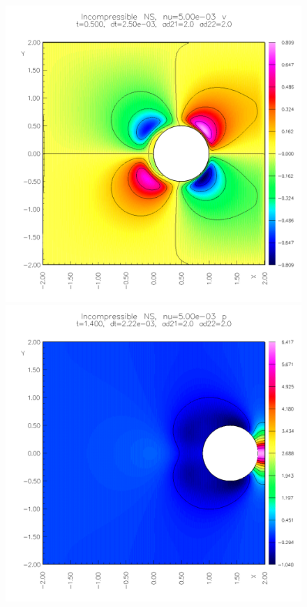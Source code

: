 {\begin{figure}
\begin{center}
\includegraphics[width=\figWidth]{figures/collide6-v-0p5}  
%
\includegraphics[width=\figWidth]{figures/collide6-p-1p4}  

\end{center}
\end{figure}}
